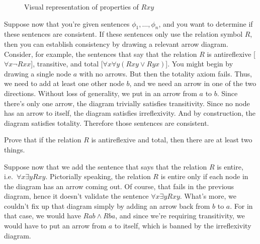 \begin{figure}[h]
  \centering
     \caption{Visual representation of properties of
    $Rxy$} \label{arrows} \end{figure}






Suppose now that you're given sentences $\phi _1,\dots ,\phi _n$, and
you want to determine if these sentences are consistent.  If these
sentences only use the relation symbol $R$, then you can establish
consistency by drawing a relevant arrow diagram.  Consider, for
example, the sentences that say that the relation $R$ is antireflexive
[$\forall x\neg Rxx$], transitive, and total
[$\forall x\forall y(Rxy\vee Ryx)$].  You might begin by drawing a
single node $a$ with no arrows.  But then the totality axiom fails.
Thus, we need to add at least one other node $b$, and we need an arrow
in one of the two directions.  Without loss of generality, we put in
an arrow from $a$ to $b$.  Since there's only one arrow, the diagram
trivially satisfies transitivity.  Since no node has an arrow to
itself, the diagram satisfies irreflexivity.  And by construction, the
diagram satisfies totality.  Therefore those sentences are consistent.

\begin{exercise} Prove that if the relation $R$ is antireflexive and
  total, then there are at least two things.  \end{exercise}

Suppose now that we add the sentence that says that the relation $R$
is entire, i.e.\ $\forall x\exists yRxy$.  Pictorially speaking, the
relation $R$ is entire only if each node in the diagram has an arrow
coming out.  Of course, that fails in the previous diagram, hence it
doesn't validate the sentence $\forall x\exists yRxy$.  What's more,
we couldn't fix up that diagram simply by adding an arrow back from
$b$ to $a$.  For in that case, we would have $Rab\wedge Rba$, and
since we're requiring transitivity, we would have to put an arrow from
$a$ to itself, which is banned by the irreflexivity diagram.

